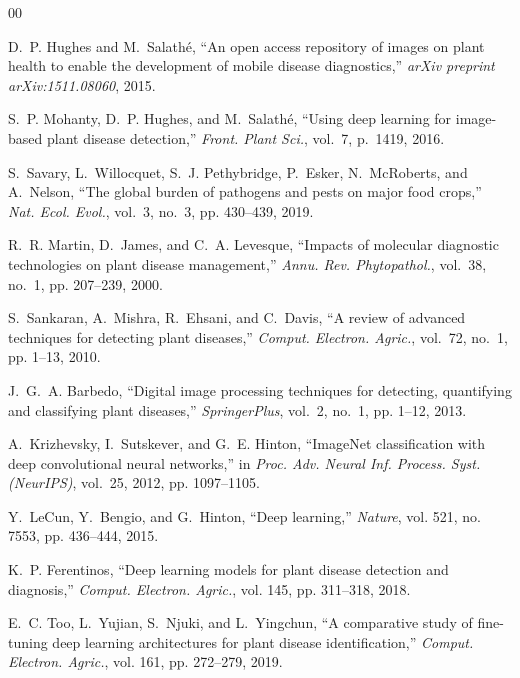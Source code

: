 \documentclass[journal]{IEEEtran}
\begin{document}
\begin{thebibliography}{00}

D.~P. Hughes and M.~Salath{\'e}, ``An open access repository of images on plant health to enable the development of mobile disease diagnostics,'' \textit{arXiv preprint arXiv:1511.08060}, 2015.

S.~P. Mohanty, D.~P. Hughes, and M.~Salath{\'e}, ``Using deep learning for image-based plant disease detection,'' \textit{Front. Plant Sci.}, vol.~7, p.~1419, 2016.

S.~Savary, L.~Willocquet, S.~J. Pethybridge, P.~Esker, N.~McRoberts, and A.~Nelson, ``The global burden of pathogens and pests on major food crops,'' \textit{Nat. Ecol. Evol.}, vol.~3, no.~3, pp. 430--439, 2019.

R.~R. Martin, D.~James, and C.~A. Levesque, ``Impacts of molecular diagnostic technologies on plant disease management,'' \textit{Annu. Rev. Phytopathol.}, vol.~38, no.~1, pp. 207--239, 2000.

S.~Sankaran, A.~Mishra, R.~Ehsani, and C.~Davis, ``A review of advanced techniques for detecting plant diseases,'' \textit{Comput. Electron. Agric.}, vol.~72, no.~1, pp. 1--13, 2010.

J.~G.~A. Barbedo, ``Digital image processing techniques for detecting, quantifying and classifying plant diseases,'' \textit{SpringerPlus}, vol.~2, no.~1, pp. 1--12, 2013.

A.~Krizhevsky, I.~Sutskever, and G.~E. Hinton, ``ImageNet classification with deep convolutional neural networks,'' in \textit{Proc. Adv. Neural Inf. Process. Syst. (NeurIPS)}, vol.~25, 2012, pp. 1097--1105.

Y.~LeCun, Y.~Bengio, and G.~Hinton, ``Deep learning,'' \textit{Nature}, vol. 521, no. 7553, pp. 436--444, 2015.

K.~P. Ferentinos, ``Deep learning models for plant disease detection and diagnosis,'' \textit{Comput. Electron. Agric.}, vol. 145, pp. 311--318, 2018.

E.~C. Too, L.~Yujian, S.~Njuki, and L.~Yingchun, ``A comparative study of fine-tuning deep learning architectures for plant disease identification,'' \textit{Comput. Electron. Agric.}, vol. 161, pp. 272--279, 2019.


\end{thebibliography}
\end{document}
